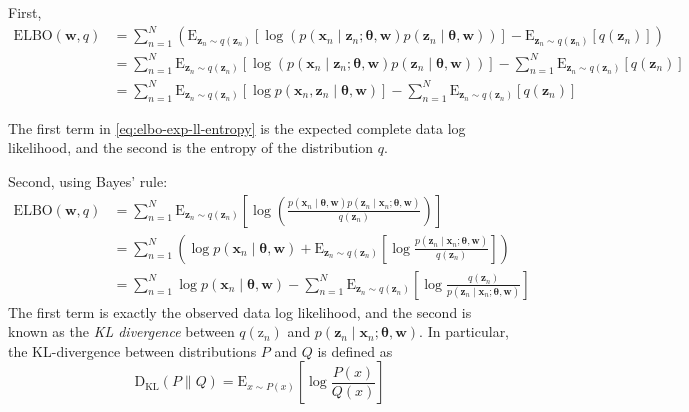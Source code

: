 First, 
\begin{align}
    \mathrm{ELBO}(\mathbf{w}, q) &= \sum_{n = 1} ^N \left(\mathrm{E}_{\mathbf{z}_n \sim q(\mathbf{z}_n)} \left[\log\left(p(\mathbf{x}_n \mid \mathbf{z}_n; \boldsymbol\theta, \mathbf{w}) p(\mathbf{z}_n \mid \boldsymbol\theta, \mathbf{w} ) \right)\right] - \mathrm{E}_{\mathbf{z}_n \sim q(\mathbf{z}_n)} [q(\mathbf{z}_n)]\right)\nonumber \\
    &= \sum_{n = 1} ^N \mathrm{E}_{\mathbf{z}_n \sim q(\mathbf{z}_n)} \left[\log\left(p(\mathbf{x}_n \mid \mathbf{z}_n; \boldsymbol\theta, \mathbf{w}) p(\mathbf{z}_n \mid \boldsymbol\theta, \mathbf{w} ) \right)\right] - \sum_{n = 1} ^N \mathrm{E}_{\mathbf{z}_n \sim q(\mathbf{z}_n)} [q(\mathbf{z}_n)]\nonumber \\
    &= \sum_{n = 1} ^N \mathrm{E}_{\mathbf{z}_n \sim q(\mathbf{z}_n)} \left[\log p(\mathbf{x}_n, \mathbf{z}_n \mid \boldsymbol\theta, \mathbf{w})\right] - \sum_{n = 1} ^N \mathrm{E}_{\mathbf{z}_n \sim q(\mathbf{z}_n)} [q(\mathbf{z}_n)] \label{eq:elbo-exp-ll-entropy}
\end{align}

The first term in \eqref{eq:elbo-exp-ll-entropy} is the expected complete data log likelihood, and the second is the entropy of the distribution $q$. 

Second, using Bayes' rule:
\begin{align}
    \mathrm{ELBO}(\mathbf{w}, q) &= \sum_{n = 1} ^N \mathrm{E}_{\mathbf{z}_n \sim q(\mathbf{z}_n)} \left[\log\left(\frac{p(\mathbf{x}_n \mid \boldsymbol{\theta}, \mathbf{w}) p(\mathbf{z}_n \mid \mathbf{x}_n; \boldsymbol{\theta}, \mathbf{w})}{q(\mathbf{z}_n)}\right)\right]\nonumber \\
    &= \sum_{n = 1} ^N \left(\log p(\mathbf{x}_n \mid \boldsymbol{\theta}, \mathbf{w}) + \mathrm{E}_{\mathbf{z}_n \sim q(\mathbf{z}_n)} \left[\log\frac{p(\mathbf{z}_n \mid \mathbf{x}_n; \boldsymbol{\theta}, \mathbf{w})}{q(\mathbf{z}_n)}\right]\right)\nonumber \\
    &= \sum_{n = 1} ^N \log p(\mathbf{x}_n \mid \boldsymbol{\theta}, \mathbf{w}) - \sum_{n = 1} ^N \mathrm{E}_{\mathbf{z}_n \sim q(\mathbf{z}_n)} \left[\log\frac{q(\mathbf{z}_n)}{p(\mathbf{z}_n \mid \mathbf{x}_n; \boldsymbol{\theta}, \mathbf{w})}\right]\label{eq:elbo-obs-ll-kl}
\end{align}
The first term is exactly the observed data log likelihood, and the second is known as the \textit{KL divergence} between $q(\mathrm{z}_n)$ and $p(\mathbf{z}_n \mid \mathbf{x}_n; \boldsymbol{\theta}, \mathbf{w})$. In particular, the KL-divergence between distributions $P$ and $Q$ is defined as
\begin{equation}
    \mathrm{D}_{\text{KL}}(P \| Q) = \mathrm{E}_{x \sim P(x)} \left[\log \frac{P(x)}{Q(x)}\right]
\end{equation}

